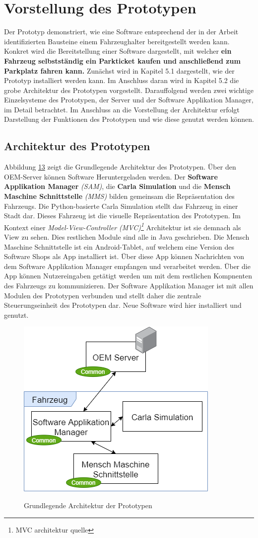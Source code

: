 \section{Vorstellung des Prototypen}\label{prototyp}
Der Prototyp demonstriert, wie eine Software entsprechend der in der Arbeit identifizierten Bausteine einem Fahrzeughalter bereitgestellt werden kann. Konkret wird die Bereitstellung einer Software dargestellt, mit welcher \textbf{ein Fahrzeug selbstständig ein Parkticket kaufen und anschließend zum Parkplatz fahren kann.} Zunächst wird in Kapitel 5.1 dargestellt, wie der Prototyp installiert werden kann. Im Anschluss daran wird in Kapitel 5.2 die grobe Architektur des Prototypen vorgestellt. Darauffolgend werden zwei wichtige Einzelsysteme des Prototypen, der Server und der Software Applikation Manager, im Detail betrachtet. Im Anschluss an die Vorstellung der Architektur erfolgt Darstellung der Funktionen des Prototypen und wie diese genutzt werden können. 

\subsection{Architektur des Prototypen}	
Abbildung \hyperref[img:basic]{13} zeigt die Grundlegende Architektur des Prototypen. Über den OEM-Server können Software Heruntergeladen werden. Der \textbf{Software Applikation Manager} \textit{(SAM)}, die \textbf{Carla Simulation} und die \textbf{Mensch Maschine Schnittstelle} \textit{(MMS)} bilden gemeinsam die Repräsentation des Fahrzeugs. Die Python-basierte Carla Simulation stellt das Fahrzeug in einer Stadt dar. Dieses Fahrzeug ist die visuelle Repräsentation des Prototypen. Im Kontext einer \textit{Model-View-Controller (MVC)\footnote{MVC architektur quelle}} Architektur ist sie demnach als View zu sehen. Dies restlichen Module sind alle in Java geschrieben. Die Mensch Maschine Schnittstelle ist ein Android-Tablet, auf welchem eine Version des Software Shops als App installiert ist. Über diese App können Nachrichten von dem Software Applikation Manager empfangen und verarbeitet werden. Über die App können Nutzereingaben getätigt werden um mit dem restlichen Kompnenten des Fahrzeugs zu kommunizieren. Der Software Applikation Manager ist mit allen Modulen des Prototypen verbunden und stellt daher die zentrale Steuerungseinheit des Prototypen dar. Neue Software wird hier installiert und genutzt. 
\begin{figure}[!h]
	\centering
	\includegraphics[width=0.5\columnwidth]{pictures/konzept-basic.png}
	\label{img:basic}
	\caption{Grundlegende Architektur der Prototypen}
\end{figure}

